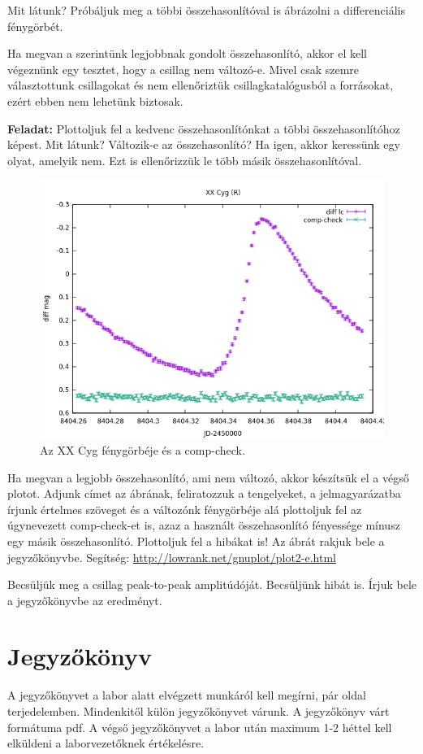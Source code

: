\documentclass{article}
\begin{document}
Mit látunk? Próbáljuk meg a többi összehasonlítóval is ábrázolni a
differenciális fénygörbét.

Ha megvan a szerintünk legjobbnak gondolt összehasonlító, akkor el kell
végeznünk egy tesztet, hogy a csillag nem változó-e. Mivel csak szemre
választottunk csillagokat és nem ellenőriztük csillagkatalógusból a forrásokat,
ezért ebben nem lehetünk biztosak.

{\bf Feladat:}
Plottoljuk fel a kedvenc összehasonlítónkat a többi összehasonlítóhoz képest.
Mit látunk? Változik-e az összehasonlító? Ha igen, akkor keressünk egy olyat,
amelyik nem. Ezt is ellenőrizzük le több másik összehasonlítóval.

\begin{figure}[ht!]
    \centering
    \includegraphics[width=0.65\linewidth]{pics/lc.png}
    \caption{Az XX Cyg fénygörbéje és a comp-check.}
    \label{lc}
\end{figure}

Ha megvan a legjobb összehasonlító, ami nem változó, akkor készítsük el a
végső plotot. Adjunk címet az ábrának, feliratozzuk a tengelyeket, a
jelmagyarázatba írjunk értelmes szöveget és a változónk fénygörbéje alá
plottoljuk fel az úgynevezett comp-check-et is, azaz a használt összehasonlító
fényessége mínusz egy másik összehasonlító. Plottoljuk fel a hibákat is!
Az ábrát rakjuk bele a jegyzőkönyvbe.
Segítség:
\url{http://lowrank.net/gnuplot/plot2-e.html}

Becsüljük meg a csillag peak-to-peak amplitúdóját. Becsüljünk hibát is.
Írjuk bele a jegyzőkönyvbe az eredményt.

\section{Jegyzőkönyv}

A jegyzőkönyvet a labor alatt elvégzett munkáról kell megírni, pár oldal
terjedelemben. Mindenkitől külön jegyzőkönyvet várunk. A jegyzőkönyv várt
formátuma pdf. A végső jegyzőkönyvet a labor után maximum 1-2 héttel kell
elküldeni a laborvezetőknek értékelésre.
\end{document}
